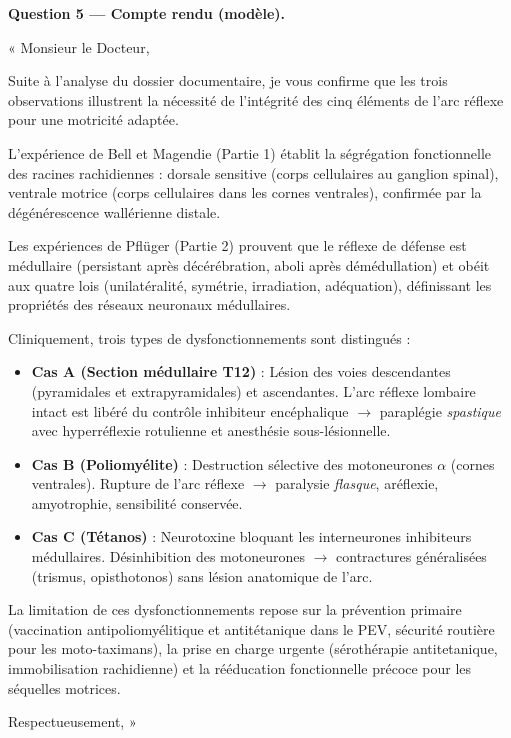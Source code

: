 \documentclass[11pt]{article}
\begin{document}
\begin{exoresolu}
\textbf{Question 5 — Compte rendu (modèle).}

« Monsieur le Docteur,

Suite à l'analyse du dossier documentaire, je vous confirme que les trois observations illustrent la nécessité de l'intégrité des cinq éléments de l'arc réflexe pour une motricité adaptée.

L'expérience de Bell et Magendie (Partie 1) établit la ségrégation fonctionnelle des racines rachidiennes : dorsale sensitive (corps cellulaires au ganglion spinal), ventrale motrice (corps cellulaires dans les cornes ventrales), confirmée par la dégénérescence wallérienne distale.

Les expériences de Pflüger (Partie 2) prouvent que le réflexe de défense est médullaire (persistant après décérébration, aboli après démédullation) et obéit aux quatre lois (unilatéralité, symétrie, irradiation, adéquation), définissant les propriétés des réseaux neuronaux médullaires.

Cliniquement, trois types de dysfonctionnements sont distingués :
\begin{itemize}
\item \textbf{Cas A (Section médullaire T12)} : Lésion des voies descendantes (pyramidales et extrapyramidales) et ascendantes. L'arc réflexe lombaire intact est libéré du contrôle inhibiteur encéphalique $\rightarrow$ paraplégie \emph{spastique} avec hyperréflexie rotulienne et anesthésie sous-lésionnelle.
\item \textbf{Cas B (Poliomyélite)} : Destruction sélective des motoneurones $\alpha$ (cornes ventrales). Rupture de l'arc réflexe $\rightarrow$ paralysie \emph{flasque}, aréflexie, amyotrophie, sensibilité conservée.
\item \textbf{Cas C (Tétanos)} : Neurotoxine bloquant les interneurones inhibiteurs médullaires. Désinhibition des motoneurones $\rightarrow$ contractures généralisées (trismus, opisthotonos) sans lésion anatomique de l'arc.
\end{itemize}

La limitation de ces dysfonctionnements repose sur la prévention primaire (vaccination antipoliomyélitique et antitétanique dans le PEV, sécurité routière pour les moto-taximans), la prise en charge urgente (sérothérapie antitetanique, immobilisation rachidienne) et la rééducation fonctionnelle précoce pour les séquelles motrices.

Respectueusement, » 
\end{exoresolu}
\end{document}
